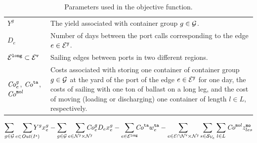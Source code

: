 \begin{table}
\begin{tabular}{lp{10cm}}
$Y^g$ 		& The yield associated with container group $g\in\mathcal{G}$.\\
$D_e$ 		& Number of days between the port calls corresponding to the edge $e\in\mathcal{E}^\texttt{y}$.\\
$\mathcal{E}^\texttt{long}\subset\mathcal{E}^\texttt{v}$ & Sailing edges between ports in two different regions.\\
$\mathit{Co}^g_e$, $\mathit{Co}^\texttt{ta}$, $\mathit{Co}^{\texttt{mo}l}$ & Costs associated with storing one container of container group $g\in\mathcal{G}$ at the yard of the port of the edge $e\in\mathcal{E}^\texttt{y}$ for one day, the costs of sailing with one ton of ballast on a long leg, and the cost of moving (loading or discharging) one container of length $l\in L$, respectively.
\end{tabular}
\caption{Parameters used in the objective function.}\label{tab:obj}
\end{table}

\begin{equation}\label{obj}
\sum_{g\in\mc{G}}\so[r]{\sum_{e\in\mi{Out}(I^\ttt{x})}}Y^g x^g_{e} 
- \sum_{g\in\mc{G}}\so[r]{\sum_{e\in \mc{N}^\ttt{y}\times\mc{N}^\ttt{y}}} \mi{Co}^g_e D_e x^g_e 
- \so[r]{\sum_{e\in\mc{E}^\ttt{long}}} \mi{Co}^\ttt{ta} w^\ttt{ta}_e 
-\sum_{e\in \mc{E}\cap \mc{N}^\ttt{v}\times\mc{N}^\ttt{y}}\sum_{s\in\mc{S}_{V_e}}\sum_{l\in L} \mi{Co}^{\ttt{mo}l} z^{\ttt{mo}}_{les}
\end{equation}
%